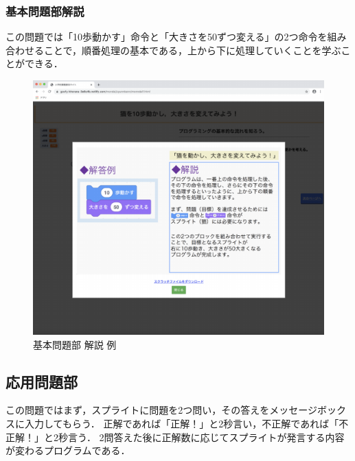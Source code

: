 \newpage

\subsubsection{基本問題部解説}
この問題では「10歩動かす」命令と「大きさを50ずつ変える」の2つ命令を組み合わせることで，順番処理の基本である，上から下に処理していくことを学ぶことができる．

\newpage
\begin{figure}[h]
\begin{center}
\includegraphics[width=15cm]{zyunnbannkotae.pdf}
\caption{基本問題部 解説 例}
\label{fig:houhou}
\end{center}
\end{figure}

\subsection{応用問題部}
この問題ではまず，スプライトに問題を2つ問い，その答えをメッセージボックスに入力してもらう．
正解であれば「正解！」と2秒言い，不正解であれば「不正解！」と2秒言う．
2問答えた後に正解数に応じてスプライトが発言する内容が変わるプログラムである．



